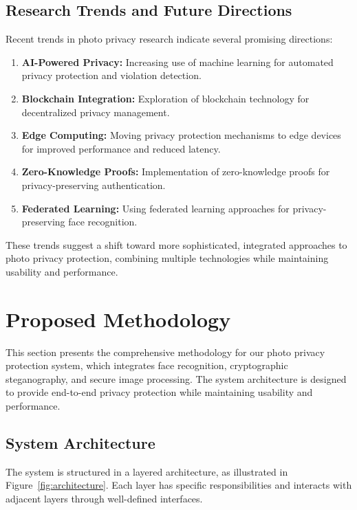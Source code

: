 \documentclass[pdflatex,sn-mathphys-num]{sn-jnl}%
\theoremstyle{thmstyleone}%
\theoremstyle{thmstyletwo}%
\theoremstyle{thmstylethree}%
\begin{document}
\subsection{Research Trends and Future Directions}

Recent trends in photo privacy research indicate several promising directions:

\begin{enumerate}
    \item \textbf{AI-Powered Privacy:} Increasing use of machine learning for automated privacy protection and violation detection.
    
    \item \textbf{Blockchain Integration:} Exploration of blockchain technology for decentralized privacy management.
    
    \item \textbf{Edge Computing:} Moving privacy protection mechanisms to edge devices for improved performance and reduced latency.
    
    \item \textbf{Zero-Knowledge Proofs:} Implementation of zero-knowledge proofs for privacy-preserving authentication.
    
    \item \textbf{Federated Learning:} Using federated learning approaches for privacy-preserving face recognition.
\end{enumerate}

These trends suggest a shift toward more sophisticated, integrated approaches to photo privacy protection, combining multiple technologies while maintaining usability and performance.

\section{Proposed Methodology}\label{sec3}

This section presents the comprehensive methodology for our photo privacy protection system, which integrates face recognition, cryptographic steganography, and secure image processing. The system architecture is designed to provide end-to-end privacy protection while maintaining usability and performance.

\subsection{System Architecture}

The system is structured in a layered architecture, as illustrated in Figure~\ref{fig:architecture}. Each layer has specific responsibilities and interacts with adjacent layers through well-defined interfaces.
\end{document}
